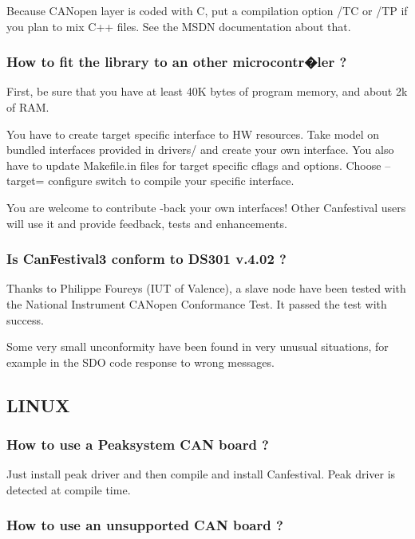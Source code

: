 \documentclass[12pt,english,a4paper]{book}
\newcommand{\canopen}{CANopen }
\begin{document}
Because \canopen layer is coded with C, put a compilation option
/TC or /TP if you plan to mix C++ files. See the MSDN documentation
about that.


\subsubsection{How to fit the library to an other microcontr�ler ?}

First, be sure that you have at least 40K bytes of program memory,
and about 2k of RAM.

You have to create target specific interface to HW resources. Take
model on bundled interfaces provided in drivers/ and create your own
interface. You also have to update Makefile.in files for target specific
cflags and options. Choose {--}target= configure switch to compile
your specific interface.

You are welcome to contribute -back your own interfaces! Other Canfestival
users will use it and provide feedback, tests and enhancements.


\subsubsection{Is CanFestival3 conform to DS301 v.4.02 ?}

Thanks to Philippe Foureys (IUT of Valence), a slave node have been
tested with the National Instrument \canopen Conformance Test. It
passed the test with success.

Some very small unconformity have been found in very unusual situations,
for example in the SDO code response to wrong messages.


\subsection{LINUX}


\subsubsection{How to use a Peaksystem CAN board ?}

Just install peak driver and then compile and install Canfestival.
Peak driver is detected at compile time.


\subsubsection{How to use an unsupported CAN board ?}
\end{document}

